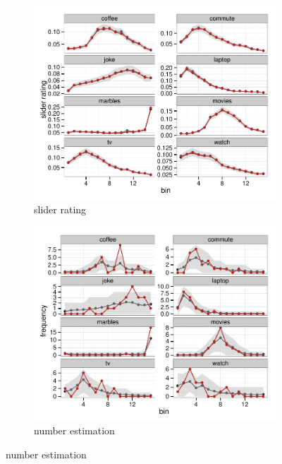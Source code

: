 \documentclass[10pt,letterpaper]{article}
\begin{document}
\begin{figure}
  \centering
  \begin{subfigure}[b]{0.5\textwidth}
    \includegraphics[width = \textwidth]{plots/ppc_slider.pdf}
    \caption{slider rating}
    \label{fig:sliderPPC}
  \end{subfigure}
   
  \begin{subfigure}[b]{0.5\textwidth}
    \includegraphics[width = \textwidth]{plots/ppc_number.pdf}
    \caption{number estimation}
    \label{fig:numberPPC}
  \end{subfigure}


\end{figure}
\end{document}
